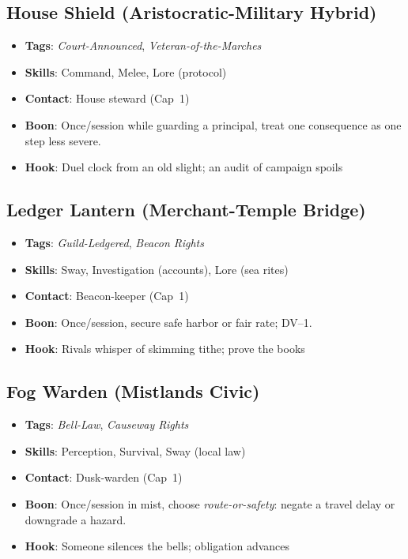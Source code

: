 \subsection*{House Shield (Aristocratic-Military Hybrid)}
\begin{itemize}
\item \textbf{Tags}: \textit{Court-Announced}, \textit{Veteran-of-the-Marches}
\item \textbf{Skills}: Command, Melee, Lore (protocol)
\item \textbf{Contact}: House steward (Cap~1)
\item \textbf{Boon}: Once/session while guarding a principal, treat one consequence as one step less severe.
\item \textbf{Hook}: Duel clock from an old slight; an audit of campaign spoils
\end{itemize}

\subsection*{Ledger Lantern (Merchant-Temple Bridge)}
\begin{itemize}
\item \textbf{Tags}: \textit{Guild-Ledgered}, \textit{Beacon Rights}
\item \textbf{Skills}: Sway, Investigation (accounts), Lore (sea rites)
\item \textbf{Contact}: Beacon-keeper (Cap~1)
\item \textbf{Boon}: Once/session, secure safe harbor or fair rate; DV--1.
\item \textbf{Hook}: Rivals whisper of skimming tithe; prove the books
\end{itemize}

\subsection*{Fog Warden (Mistlands Civic) }
\begin{itemize}
\item \textbf{Tags}: \textit{Bell-Law}, \textit{Causeway Rights}
\item \textbf{Skills}: Perception, Survival, Sway (local law)
\item \textbf{Contact}: Dusk-warden (Cap~1)
\item \textbf{Boon}: Once/session in mist, choose \emph{route-or-safety}: negate a travel delay or downgrade a hazard.
\item \textbf{Hook}: Someone silences the bells; obligation advances
\end{itemize}

